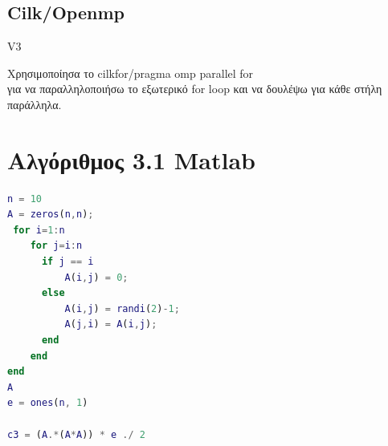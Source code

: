 \documentclass[10pt]{report}
\begin{document}
\subsection{Cilk/Openmp}
V3

Χρησιμοποίησα το cilkfor/pragma omp parallel for \\
για να παραλληλοποιήσω το εξωτερικό for loop και να δουλέψω για κάθε στήλη παράλληλα.
\section{\color{blue} Aλγόριθμος 3.1 Matlab}
\begin{lstlisting}[language=Matlab]
n = 10
A = zeros(n,n);
 for i=1:n
    for j=i:n
      if j == i
          A(i,j) = 0;
      else
          A(i,j) = randi(2)-1;
          A(j,i) = A(i,j);
      end
    end
end
A
e = ones(n, 1)

c3 = (A.*(A*A)) * e ./ 2
\end{lstlisting}
\newpage
\end{document}
